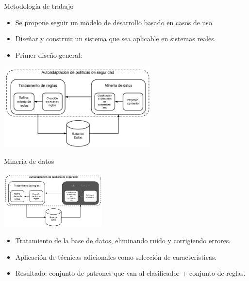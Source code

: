 \documentclass{beamer}
\begin{document}
\begin{frame}{Metodología de trabajo}

\begin{itemize}
  \item Se propone seguir un modelo de desarrollo basado en casos de uso.
  \item Diseñar y construir un sistema que sea aplicable en sistemas reales.
  \item Primer diseño general:
\end{itemize}

\begin{center}
\includegraphics[width=0.6\textwidth]{./imgs/KRS.png}
\end{center}

\end{frame}

\begin{frame}{Minería de datos}

\begin{center}
\includegraphics[width=0.4\textwidth]{./imgs/KRS1.png}
\end{center}

\begin{itemize}
  \item Tratamiento de la base de datos, eliminando ruido y corrigiendo errores.
  \item Aplicación de técnicas adicionales como selección de características.
  \item Resultado: conjunto de patrones que van al clasificador + conjunto de reglas.
\end{itemize}

\end{frame}
\end{document}
